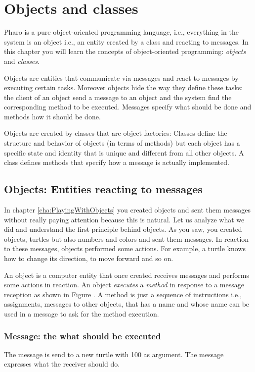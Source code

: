 \documentclass[10pt,twoside,english]{_support/latex/sbabook/sbabook}
\begin{document}
\frontmatter
\pagestyle{plain}

\tableofcontents*
\clearpage\listoffigures

\mainmatter

\chapter{Objects and classes}\label{cha_objects}
Pharo is a pure object-oriented programming language, i.e., everything in the system is an object i.e., an entity created by a class and reacting to messages. In this chapter you will learn the concepts of object-oriented programming: \textit{objects} and \textit{classes}. 

Objects are entities that communicate via messages and react to messages by executing certain tasks. Moreover objects hide the way they define these tasks: the client of an object send a message to an object and the system find the corresponding method to be executed. Messages specify what should be done and methods how it should be done. 

Objects are created by classes that are object factories: Classes define the structure and behavior of objects (in terms of methods) but each object has a specific state and identity that is unique and different from all other objects. A class defines methods that specify how a message is actually implemented. 
\section{Objects: Entities reacting to messages}
In chapter \ref{cha:PlayingWithObjects} you created objects and sent them messages without really paying attention because this is natural. Let us analyze what we did and understand the first principle behind objects. As you saw, you created objects, turtles but also numbers and colors and sent them messages. In reaction to these messages, objects performed some actions. For example, a turtle knows how to change its direction, to move forward and so on.

An object is a computer entity that once created receives messages and performs some actions in reaction. An object \textit{executes} a \textit{method} in response to a message reception as shown in Figure . A method is just a sequence of instructions i.e., assignments, messages to other objects, that has a name and whose name can be used in a message to ask for the method execution. 
\subsection{Message: the what should be executed}
The message  is send to a new turtle with 100 as argument. The message expresses what the receiver should do. 
\end{document}
